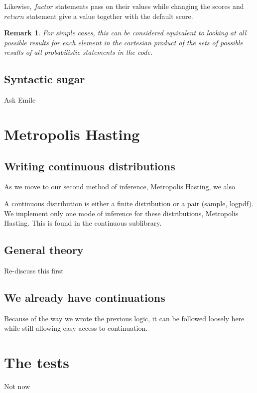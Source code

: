 \documentclass{article}
\newcommand\SC[1]{{\color{violet}{\it \bf Simon :} #1}}
\newtheorem{remark}{Remark}
\begin{document}
	Likewise, $factor$ statements pass on their values while changing the scores and $return$ statement give a value together with the default score.

	\begin{remark}
	  For simple cases, this can be considered equivalent to looking at all possible results for each element in the cartesian product of the sets of possible results of all probabilistic statements in the code.
	\end{remark}

	\subsection{Syntactic sugar}
	\label{subseq:sugar}

	\SC{Ask Emile}

\section{Metropolis Hasting}

	\subsection{Writing continuous distributions}

	As we move to our second method of inference, Metropolis Hasting, we also 

	A continuous distribution is either a finite distribution or a pair (sample, logpdf).
	We implement only one mode of inference for these distributions, Metropolis Hasting.
	This is found in the continuous sublibrary.

	\subsection{General theory}

	\SC{Re-discuss this first}

	\subsection{We already have continuations}

	Because of the way we wrote the previous logic, it can be followed loosely here while still allowing easy access to continuation.


\section{The tests}

\SC{Not now}
\end{document}
